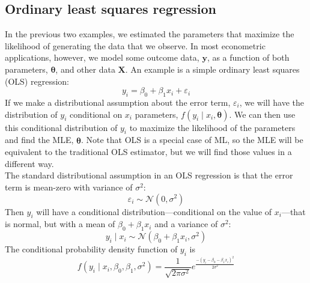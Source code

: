 \documentclass[11pt,letterpaper]{article}
\begin{document}
\subsection{Ordinary least squares regression}

In the previous two examples, we estimated the parameters that maximize the likelihood of generating the data that we observe. In most econometric applications, however, we model some outcome data, $\bm{y}$, as a function of both parameters, $\bm{\theta}$, and other data $\bm{X}$. An example is a simple ordinary least squares (OLS) regression:
$$y_i = \beta_0 + \beta_1 x_i + \varepsilon_i$$
If we make a distributional assumption about the error term, $\varepsilon_i$, we will have the distribution of $y_i$ conditional on $x_i$ parameters, $f(y_i \mid x_i, \bm{\theta})$. We can then use this conditional distribution of $y_i$ to maximize the likelihood of the parameters and find the MLE, $\widehat{\bm{\theta}}$. Note that OLS is a special case of ML, so the MLE will be equivalent to the traditional OLS estimator, but we will find those values in a different way. \\

\noindent The standard distributional assumption in an OLS regression is that the error term is mean-zero with variance of $\sigma^2$:
$$\varepsilon_i \sim \mathcal{N}(0, \sigma^2)$$
Then $y_i$ will have a conditional distribution---conditional on the value of $x_i$---that is normal, but with a mean of $\beta_0 + \beta_1 x_i$ and a variance of $\sigma^2$:
$$y_i \mid x_i \sim \mathcal{N}(\beta_0 + \beta_1 x_i, \sigma^2)$$
The conditional probability density function of $y_i$ is
$$f(y_i \mid x_i, \beta_0, \beta_1, \sigma^2) = \frac{1}{\sqrt{2 \pi \sigma^2}} e^{\frac{-(y_i - \beta_0 - \beta_1 x_i)^2}{2 \sigma^2}}$$
\end{document}
